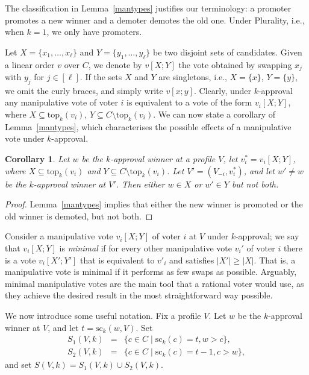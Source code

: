 \documentclass[11pt]{article}
\newtheorem{corollary}[theorem]{Corollary}
\newcommand{\tp}{\mathrm{top}}
\newcommand{\scr}{\mathrm{sc}}
\begin{document}
The classification in Lemma~\ref{mantypes} justifies our terminology:
a promoter promotes a new winner and a demoter demotes the old one.
Under Plurality, i.e., when $k=1$, we only have promoters. 

Let $X = \{x_1, \dots, x_\ell\}$ and $Y = \{y_1, \dots, y_\ell\}$ be two disjoint sets of candidates.
Given a linear order $v$ over $C$, we denote by $v[X; Y]$ the vote obtained
by swapping $x_j$ with $y_j$ for $j\in[\ell]$.
If the sets $X$ and $Y$ are singletons, i.e., $X=\{x\}$, $Y=\{y\}$,
we omit the curly braces, and simply write $v[x;y]$.
Clearly, under $k$-approval any manipulative vote of voter $i$ is equivalent 
to a vote of the form $v_i[X; Y]$, where $X\subseteq\tp_k(v_i)$, $Y\subseteq C\setminus\tp_k(v_i)$. 
We can now state a corollary of Lemma~\ref{mantypes}, which
characterises the possible effects of a manipulative vote under 
$k$-approval.

\begin{corollary}\label{prop:change}
Let $w$ be the $k$-approval winner at a profile $V$, let $v^*_i=v_i[X; Y]$, 
where $X\subseteq \tp_k(v_i)$ and $Y\subseteq C\setminus\tp_k(v_i)$.
Let $V'=(V_{-i},v^*_i)$, and let $w'\ne w$ be the $k$-approval winner at $V'$. 
Then either  $w\in X$ or $w'\in Y$ but not both.  
\end{corollary}

\begin{proof}
Lemma~\ref{mantypes} implies that either the new winner is promoted or the old winner is demoted, but not both.
\end{proof}

Consider a manipulative vote $v_i[X;Y]$ of voter $i$ at $V$ under $k$-approval;
we say that $v_i[X;Y]$ is {\em minimal} if for every other manipulative vote $v_i'$
of voter $i$ there is a vote $v_i[X';Y']$ that is equivalent to $v'_i$ and satisfies $|X'|\ge |X|$. That is, a 
manipulative vote is minimal if it performs as few swaps as possible. 
Arguably, minimal manipulative votes are the main tool that a rational voter would use,
as they achieve the desired result in the most straightforward way possible.

We now introduce some useful notation.
%
Fix a profile $V$. Let $w$ be the $k$-approval winner at $V$, 
and let $t = \scr_k(w, V)$. Set
\begin{eqnarray*}
S_1(V, k) &=& \{c\in C\mid \scr_k(c)=t, w>c\},\\ 
S_2(V, k) &=& \{c\in C\mid \scr_k(c)=t-1, c>w\},
\end{eqnarray*}
and set $S(V, k)=S_1(V, k)\cup S_2(V, k)$. 
\end{document}
